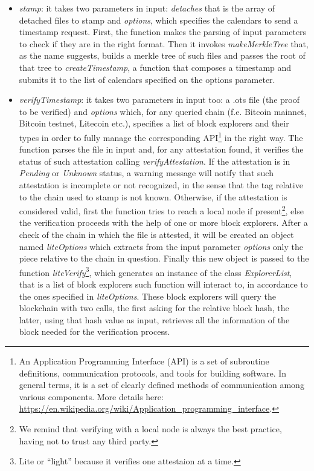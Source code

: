 \begin{itemize}
    \item \textit{stamp}: it takes two parameters in input: \textit{detaches} that is the array of detached files to stamp and \textit{options}, which specifies the calendars to send a timestamp request. First, the function makes the parsing of input parameters to check if they are in the right format. Then it invokes \textit{makeMerkleTree} that, as the name suggests, builds a merkle tree of such files and passes the root of that tree to \textit{createTimestamp}, a function that composes a timestamp and submits it to the list of calendars specified on the options parameter.
    \item \textit{verifyTimestamp}: it takes two parameters in input too: a \colorbox{light-gray}{.ots} file (the proof to be verified) and \textit{options} which, for any queried chain (f.e. Bitcoin mainnet, Bitcoin testnet, Litecoin etc.), specifies a list of block explorers and their types in order to fully manage the corresponding API\footnote{An Application Programming Interface (API) is a set of subroutine definitions, communication protocols, and tools for building software. In general terms, it is a set of clearly defined methods of communication among various components. More details here: \url{https://en.wikipedia.org/wiki/Application_programming_interface}.} in the right way. The function parses the file in input and, for any attestation found, it verifies the status of such attestation calling \textit{verifyAttestation}. If the attestation is in \textit{Pending} or \textit{Unknown} status, a warning message will notify that such attestation is incomplete or not recognized, in the sense that the tag relative to the chain used to stamp is not known. Otherwise, if the attestation is considered valid, first the function tries to reach a local node if present\footnote{We remind that verifying with a local node is always the best practice, having not to trust any third party.}, else the verification proceeds with the help of one or more block explorers. After a check of the chain in which the file is attested, it will be created an object named \textit{liteOptions} which extracts from the input parameter \textit{options} only the piece relative to the chain in question. Finally this new object is passed to the function \textit{liteVerify}\textup{\footnote{Lite or \enquote{light} because it verifies one attestaion at a time.}}, which generates an instance of the class \textit{ExplorerList}, that is a list of block explorers such function will interact to, in accordance to the ones specified in \textit{liteOptions}. These block explorers will query the blockchain with two calls, the first asking for the relative block hash, the latter, using that hash value as input, retrieves all the information of the block needed for the verification process.
\end{itemize}


